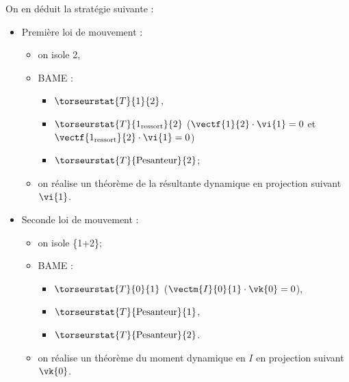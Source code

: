 On en déduit la stratégie suivante : 
\begin{itemize}
\item Première loi de mouvement : 
\begin{itemize}
\item on isole 2,
\item BAME : 
\begin{itemize}
\item $\torseurstat{T}{1}{2}$, 
\item $\torseurstat{T}{1_{\text{ressort}}}{2}$ ($\vectf{1}{2}\cdot \vi{1}= 0$ et $\vectf{1_{\text{ressort}}}{2}\cdot \vi{1}= 0$)
\item $\torseurstat{T}{\text{Pesanteur}}{2}$;
\end{itemize}
\item on réalise un théorème de la résultante dynamique en projection suivant $\vi{1}$. 
\end{itemize}
\item Seconde loi de mouvement : 
\begin{itemize}
\item on isole \{1+2\};
\item BAME :
\begin{itemize} 
\item $\torseurstat{T}{0}{1}$ ($\vectm{I}{0}{1}\cdot \vk{0}= 0$), 
\item $\torseurstat{T}{\text{Pesanteur}}{1}$,
\item  $\torseurstat{T}{\text{Pesanteur}}{2}$.
\end{itemize}
\item on réalise un théorème du moment dynamique en $I$ en projection suivant $\vk{0}$. 
\end{itemize}
\end{itemize}
\else
\fi

\ifcolle
{}
\else
\fi

\ifprof
\else


\fi